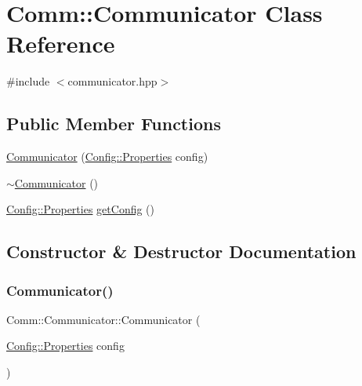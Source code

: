 \hypertarget{class_comm_1_1_communicator}{}\section{Comm\+:\+:Communicator Class Reference}
\label{class_comm_1_1_communicator}


{\ttfamily \#include $<$communicator.\+hpp$>$}

\subsection*{Public Member Functions}
\begin{DoxyCompactItemize}
\item 
\hyperlink{class_comm_1_1_communicator_ad1be12b52b0e857d8a822669a73a13ff}{Communicator} (\hyperlink{class_config_1_1_properties}{Config\+::\+Properties} config)
\item 
\hyperlink{class_comm_1_1_communicator_aff2c0066eaf03ff367dbcf45e85e4bff}{$\sim$\+Communicator} ()
\item 
\hyperlink{class_config_1_1_properties}{Config\+::\+Properties} \hyperlink{class_comm_1_1_communicator_ab03173df851ed3eb0f84f83f1ecd455f}{get\+Config} ()
\end{DoxyCompactItemize}


\subsection{Constructor \& Destructor Documentation}
\mbox{\label{class_comm_1_1_communicator_ad1be12b52b0e857d8a822669a73a13ff}} 
\subsubsection{\texorpdfstring{Communicator()}{Communicator()}}
{\footnotesize\ttfamily Comm\+::\+Communicator\+::\+Communicator (\begin{DoxyParamCaption}\item[{\hyperlink{class_config_1_1_properties}{Config\+::\+Properties}}]{config }\end{DoxyParamCaption})}

\mbox{\label{class_comm_1_1_communicator_aff2c0066eaf03ff367dbcf45e85e4bff}} 
